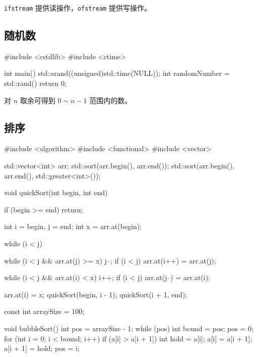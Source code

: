 \documentclass[UTF8,fontset=fandol,zihao=5]{ctexart}
\newcommand{\code}[1]{\texttt{#1}}
\begin{document}
\code{ifstream} 提供读操作，\code{ofstream} 提供写操作。

\subsection{随机数}

\begin{cppcode}[随机数]
#include <cstdlib>
#include <ctime>

int main() {
    std::srand((unsigned)std::time(NULL));
    int randomNumber = std::rand() %
    return 0;
}
\end{cppcode}

对 $n$ 取余可得到 $0\sim n-1$ 范围内的数。

\subsection{排序}

\begin{cppcode}[标准库排序]
#include <algorithm>
#include <functional>
#include <vector>

std::vector<int> arr;
std::sort(arr.begin(), arr.end());
std::sort(arr.begin(), arr.end(), std::greater<int>());
\end{cppcode}

\begin{cppcode}[快速排序]
void quickSort(int begin, int end) {
    if (begin >= end) return;

    int i = begin, j = end;
    int x = arr.at(begin);

    while (i < j) {
        while (i < j && arr.at(j) >= x) j--;
        if (i < j) arr.at(i++) = arr.at(j);

        while (i < j && arr.at(i) < x) i++;
        if (i < j) arr.at(j--) = arr.at(i);
    }

    arr.at(i) = x;
    quickSort(begin, i - 1);
    quickSort(i + 1, end);
}
\end{cppcode}

\begin{cppcode}[冒泡排序]
const int arraySize = 100;

void bubbleSort() {
    int pos = arraySize - 1;
    while (pos) {
        int bound = pos;
        pos = 0;
        for (int i = 0; i < bound; i++) {
            if (a[i] > a[i + 1]) {
                int hold = a[i];
                a[i] = a[i + 1];
                a[i + 1] = hold;
                pos = i;
            }
        }
    }
}
\end{cppcode}
\end{document}
